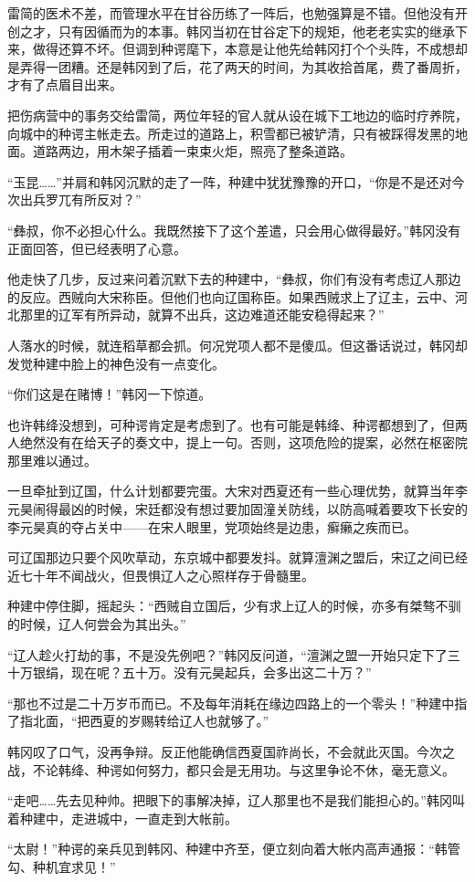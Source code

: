 雷简的医术不差，而管理水平在甘谷历练了一阵后，也勉强算是不错。但他没有开创之才，只有因循而为的本事。韩冈当初在甘谷定下的规矩，他老老实实的继承下来，做得还算不坏。但调到种谔麾下，本意是让他先给韩冈打个个头阵，不成想却是弄得一团糟。还是韩冈到了后，花了两天的时间，为其收拾首尾，费了番周折，才有了点眉目出来。

把伤病营中的事务交给雷简，两位年轻的官人就从设在城下工地边的临时疗养院，向城中的种谔主帐走去。所走过的道路上，积雪都已被铲清，只有被踩得发黑的地面。道路两边，用木架子插着一束束火炬，照亮了整条道路。

“玉昆……”并肩和韩冈沉默的走了一阵，种建中犹犹豫豫的开口，“你是不是还对今次出兵罗兀有所反对？”

“彝叔，你不必担心什么。我既然接下了这个差遣，只会用心做得最好。”韩冈没有正面回答，但已经表明了心意。

他走快了几步，反过来问着沉默下去的种建中，“彝叔，你们有没有考虑辽人那边的反应。西贼向大宋称臣。但他们也向辽国称臣。如果西贼求上了辽主，云中、河北那里的辽军有所异动，就算不出兵，这边难道还能安稳得起来？”

人落水的时候，就连稻草都会抓。何况党项人都不是傻瓜。但这番话说过，韩冈却发觉种建中脸上的神色没有一点变化。

“你们这是在赌博！”韩冈一下惊道。

也许韩绛没想到，可种谔肯定是考虑到了。也有可能是韩绛、种谔都想到了，但两人绝然没有在给天子的奏文中，提上一句。否则，这项危险的提案，必然在枢密院那里难以通过。

一旦牵扯到辽国，什么计划都要完蛋。大宋对西夏还有一些心理优势，就算当年李元昊闹得最凶的时候，宋廷都没有想过要加固潼关防线，以防高喊着要攻下长安的李元昊真的夺占关中——在宋人眼里，党项始终是边患，癣癞之疾而已。

可辽国那边只要个风吹草动，东京城中都要发抖。就算澶渊之盟后，宋辽之间已经近七十年不闻战火，但畏惧辽人之心照样存于骨髓里。

种建中停住脚，摇起头：“西贼自立国后，少有求上辽人的时候，亦多有桀骜不驯的时候，辽人何尝会为其出头。”

“辽人趁火打劫的事，不是没先例吧？”韩冈反问道，“澶渊之盟一开始只定下了三十万银绢，现在呢？五十万。没有元昊起兵，会多出这二十万？”

“那也不过是二十万岁币而已。不及每年消耗在缘边四路上的一个零头！”种建中指了指北面，“把西夏的岁赐转给辽人也就够了。”

韩冈叹了口气，没再争辩。反正他能确信西夏国祚尚长，不会就此灭国。今次之战，不论韩绛、种谔如何努力，都只会是无用功。与这里争论不休，毫无意义。

“走吧……先去见种帅。把眼下的事解决掉，辽人那里也不是我们能担心的。”韩冈叫着种建中，走进城中，一直走到大帐前。

“太尉！”种谔的亲兵见到韩冈、种建中齐至，便立刻向着大帐内高声通报：“韩管勾、种机宜求见！”

